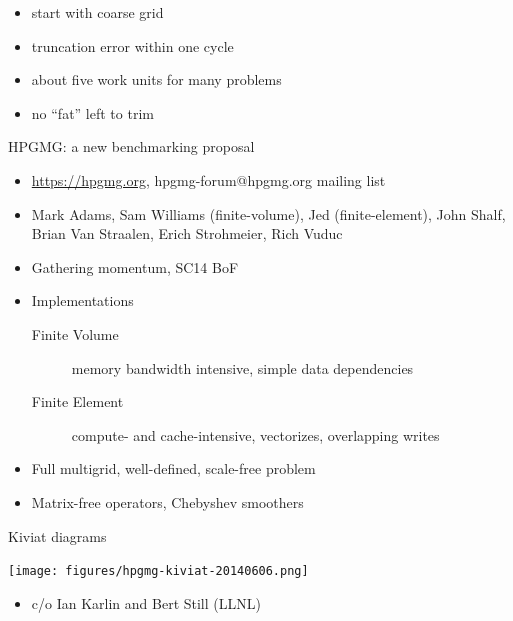 \documentclass{beamer}
\begin{document}
\begin{frame}[fragile]
\begin{figure}
\label{fig:FMG}
\end{figure}
\begin{itemize}
  \item start with coarse grid
  \item truncation error within one cycle
  \item about five work units for many problems
  \item no ``fat'' left to trim
\end{itemize}
\end{frame}

\begin{frame}{HPGMG: a new benchmarking proposal}
  \begin{itemize}
  \item \url{https://hpgmg.org}, hpgmg-forum@hpgmg.org mailing list
  \item Mark Adams, Sam Williams (finite-volume), Jed (finite-element), John Shalf, Brian Van Straalen, Erich Strohmeier, Rich Vuduc
  \item Gathering momentum, SC14 BoF
  \item Implementations
    \begin{description}
    \item[Finite Volume] memory bandwidth intensive, simple data dependencies
    \item[Finite Element] compute- and cache-intensive, vectorizes, overlapping writes
    \end{description}
  \item Full multigrid, well-defined, scale-free problem
  \item Matrix-free operators, Chebyshev smoothers
  \end{itemize}
\end{frame}

\begin{frame}{Kiviat diagrams}
  \begin{center}
    \texttt{[image: figures/hpgmg-kiviat-20140606.png]}
  \end{center}
  \begin{itemize}
  \item c/o Ian Karlin and Bert Still (LLNL)
  \end{itemize}
\end{frame}
\end{document}
